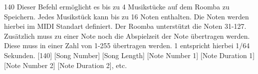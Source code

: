 140 Dieser Befehl ermöglicht es bis zu 4 Musikstücke auf dem Roomba zu Speichern. Jedes Musikstück kann bis zu 16 Noten enthalten. Die Noten werden hierbei im M\-I\-D\-I Standart definiert. Der Roomba unterstützt die Noten 31-\/127. Zusätzlich muss zu einer Note noch die Abspielzeit der Note übertragen werden. Diese muss in einer Zahl von 1-\/255 übertragen werden. 1 entspricht hierbei 1/64 Sekunden. \mbox{[}140\mbox{]} \mbox{[}Song Number\mbox{]} \mbox{[}Song Length\mbox{]} \mbox{[}Note Number 1\mbox{]} \mbox{[}Note Duration 1\mbox{]} \mbox{[}Note Number 2\mbox{]} \mbox{[}Note Duration 2\mbox{]}, etc. 